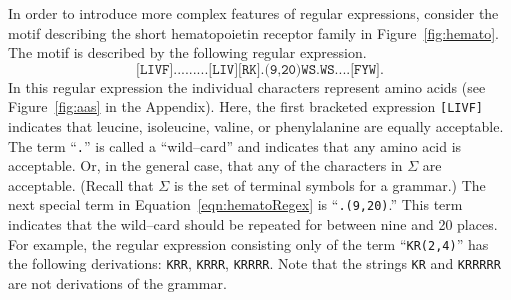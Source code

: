 In order to introduce more complex features of regular expressions,
consider the motif describing the short hematopoietin receptor
family in Figure~\vref{fig:hemato}.  The motif is described by the
following regular expression.
\begin{equation}\label{eqn:hematoRegex}
    \texttt{[LIVF].........[LIV][RK].(9,20)WS.WS....[FYW]}.
\end{equation}
In this regular expression the individual characters represent amino
acids (see Figure~\vref{fig:aas} in the Appendix).  Here, the first
bracketed expression \texttt{[LIVF]} indicates that leucine,
isoleucine, valine, or phenylalanine are equally acceptable.  The
term ``\texttt{.}'' is called a ``wild--card'' and indicates that
any amino acid is acceptable.  Or, in the general case, that any of
the characters in $\Sigma$ are acceptable.  (Recall that $\Sigma$ is
the set of terminal symbols for a grammar.)  The next special term
in Equation~\ref{eqn:hematoRegex} is ``\texttt{.(9,20)}.''  This
term indicates that the wild--card should be repeated for between
nine and 20 places.  For example, the regular expression consisting
only of the term ``\texttt{KR(2,4)}'' has the following derivations:
\texttt{KRR}, \texttt{KRRR}, \texttt{KRRRR}.  Note that the strings
\texttt{KR} and \texttt{KRRRRR} are not derivations of the grammar.


